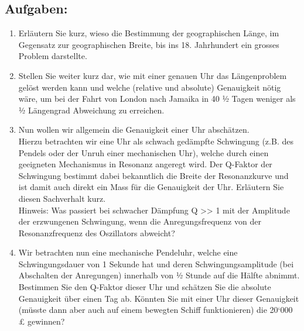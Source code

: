 \subsection{Aufgaben:}
\begin{enumerate}
  \item Erläutern Sie kurz, wieso die Bestimmung der geographischen Länge, im 
        Gegensatz zur geographischen Breite, bis ins 18. Jahrhundert ein 
        grosses Problem darstellte.
  \item Stellen Sie weiter kurz dar, wie mit einer genauen Uhr das 
        Längenproblem gelöst werden kann und welche (relative und absolute) 
        Genauigkeit nötig wäre, um bei der Fahrt von London nach Jamaika in 
        40 ½ Tagen weniger als ½ Längengrad Abweichung zu erreichen.
  \item Nun wollen wir allgemein die Genauigkeit einer Uhr abschätzen. \\
        Hierzu betrachten wir eine Uhr als schwach gedämpfte Schwingung (z.B. 
        des Pendels oder der Unruh einer mechanischen Uhr), welche durch einen 
        geeigneten Mechanismus in Resonanz angeregt wird. Der Q-Faktor der 
        Schwingung bestimmt dabei bekanntlich die Breite der Resonanzkurve und 
        ist damit auch direkt ein Mass für die Genauigkeit der Uhr. Erläutern 
        Sie diesen Sachverhalt kurz. \\
        Hinweis: Was passiert bei schwacher Dämpfung Q >> 1 mit der Amplitude 
        der erzwungenen Schwingung, wenn die Anregungsfrequenz von der 
        Resonanzfrequenz des Oszillators abweicht?
  \item Wir betrachten nun eine mechanische Pendeluhr, welche eine 
        Schwingungsdauer von 1 Sekunde hat und deren Schwingungsamplitude (bei 
        Abschalten der Anregungen) innerhalb von ½ Stunde auf die Hälfte 
        abnimmt. Bestimmen Sie den Q-Faktor dieser Uhr und schätzen Sie die 
        absolute Genauigkeit über einen Tag ab. Könnten Sie mit einer Uhr 
        dieser Genauigkeit (müsste dann aber auch auf einem bewegten Schiff 
        funktionieren) die 20‘000 £ gewinnen?
\end{enumerate}

